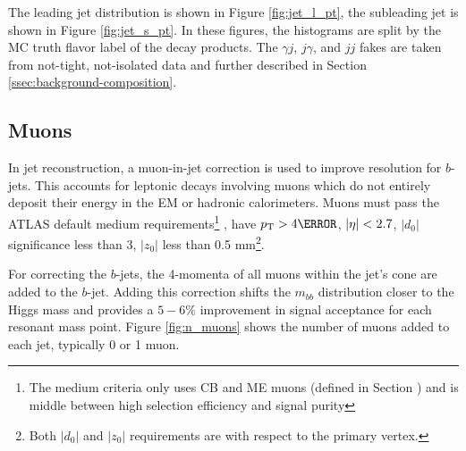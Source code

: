 The leading jet \pt distribution is shown in Figure \ref{fig:jet_l_pt}, the subleading jet \pt is shown in Figure \ref{fig:jet_s_pt}. In these figures, the histograms are split by the \gls{MC} truth flavor label of the \Hbb decay products. The $\gamma j$, $j\gamma$, and $jj$ fakes are taken from not-tight, not-isolated data and further described in Section \ref{ssec:background-composition}.

\subsection{Muons}

In jet reconstruction, a muon-in-jet correction is used to improve resolution for $b$-jets. This accounts for leptonic decays involving muons which do not entirely deposit their energy in the \gls{EM} or hadronic calorimeters. Muons must pass the ATLAS default medium requirements\footnote{The medium criteria only uses CB and ME muons (defined in Section \label{ssec:muon-reco}) and is middle between high selection efficiency and signal purity} \cite{muon-identification}, have $\pt > \unit{4}{\GeV}$, $|\eta| < 2.7$, $|d_{0}|$ significance less than 3, $|z_{0}|$ less than 0.5 mm\footnote{Both $|d_{0}|$ and $|z_{0}|$ requirements are with respect to the primary vertex.}.

For correcting the $b$-jets, the 4-momenta of all muons within the jet's \Dr cone are added to the $b$-jet. Adding this correction shifts the $m_{bb}$ distribution closer to the Higgs mass and provides a $5-6\%$ improvement in signal acceptance for each resonant mass point. Figure \ref{fig:n_muons} shows the number of muons added to each jet, typically 0 or 1 muon.

